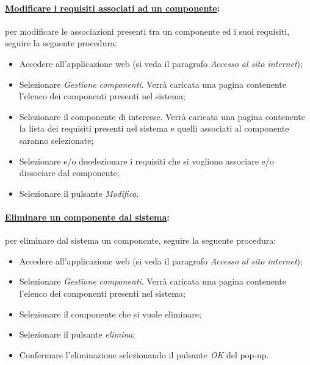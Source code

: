 \paragraph{\underline{Modificare i requisiti associati ad un componente}:}
per modificare le associazioni presenti tra un componente ed i suoi requisiti, seguire la seguente procedura:
\begin{itemize}
\item Accedere all'applicazione web (si veda il paragrafo \textit{Accesso al sito internet});
\item Selezionare \textit{Gestione componenti}. Verrà caricata una pagina contenente l'elenco dei componenti presenti nel sistema;
\item Selezionare il componente di interesse. Verrà caricata una pagina contenente la lista dei requisiti presenti nel sistema e quelli associati al componente saranno selezionate;
\item Selezionare e/o deselezionare i requisiti che si vogliono associare e/o dissociare dal componente;
\item Selezionare il pulsante \textit{Modifica}. 
\end{itemize}

\paragraph{\underline{Eliminare un componente dal sistema}:}
per eliminare dal sistema un componente, seguire la seguente procedura:
\begin{itemize}
\item Accedere all'applicazione web (si veda il paragrafo \textit{Accesso al sito internet});
\item Selezionare \textit{Gestione componenti}. Verrà caricata una pagina contenente l'elenco dei componenti presenti nel sistema;
\item Selezionare il componente che si vuole eliminare;
\item Selezionare il pulsante \textit{elimina};
\item Confermare l'eliminazione selezionando il pulsante \textit{OK} del pop-up.
\end{itemize}

